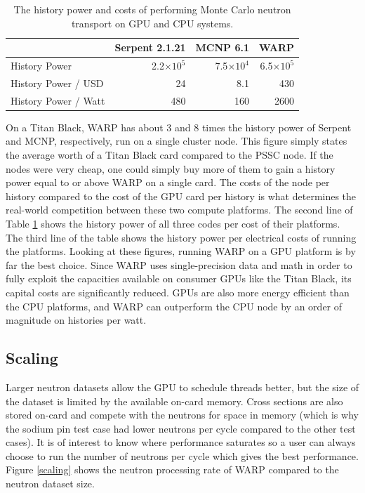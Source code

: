 \documentclass[preprint,12pt]{elsarticle}
\begin{document}
\begin{table}[h]
\centering
\caption{The history power and costs of performing Monte Carlo neutron transport on GPU and CPU systems.}
\label{history_power}
\small
\begin{tabular}{| l | r | r | r |}
\hline
              &  Serpent 2.1.21 & MCNP 6.1 & WARP  \\
\hline
History Power   &  2.2$\times10^5$	 & 7.5$\times10^4$	 & 6.5$\times10^5$    \\
\hline
History Power / USD    & 24 & 	8.1	 & 430    \\
\hline
History Power / Watt   & 480	 & 160	 & 2600    \\
\hline
\end{tabular}
\end{table}

On a Titan Black, WARP has about 3 and 8 times the history power of Serpent and MCNP, respectively, run on a single cluster node.    This figure simply states the average worth of a Titan Black card compared to the PSSC node.  If the nodes were very cheap, one could simply buy more of them to gain a history power equal to or above WARP on a single card.  The costs of the node per history compared to the cost of the GPU card per history is what determines the real-world competition between these two compute platforms.  The second line of Table \ref{history_power} shows the history power of all three codes per cost of their platforms.  The third line of the table shows the history power per electrical costs of running the platforms.  Looking at these figures, running WARP on a GPU platform is by far the best choice.  Since WARP uses single-precision data and math in order to fully exploit the capacities available on consumer GPUs like the Titan Black, its capital costs are significantly reduced.  GPUs are also more energy efficient than the CPU platforms, and WARP can outperform the CPU node by an order of magnitude on histories per watt.

\subsection{Scaling}

Larger neutron datasets allow the GPU to schedule threads better, but the size of the dataset is limited by the available on-card memory.  Cross sections are also stored on-card and compete with the neutrons for space in memory (which is why the sodium pin test case had lower neutrons per cycle compared to the other test cases).  It is of interest to know where performance saturates so a user can always choose to run the number of neutrons per cycle which gives the best performance.  Figure \ref{scaling} shows the neutron processing rate of WARP compared to the neutron dataset size.
\end{document}
